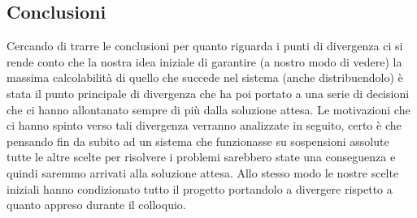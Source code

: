 \subsection{Conclusioni}
Cercando di trarre le conclusioni per quanto riguarda i punti di divergenza ci si rende conto che la nostra idea iniziale di garantire (a nostro modo di vedere) la massima calcolabilità di quello che succede nel sistema (anche distribuendolo) è stata il punto principale di divergenza che ha poi portato a una serie di decisioni che ci hanno allontanato sempre di più dalla soluzione attesa. Le motivazioni che ci hanno spinto verso tali divergenza verranno analizzate in seguito, certo è che pensando fin da subito ad un sistema che funzionasse su sospensioni assolute tutte le altre scelte per risolvere i problemi sarebbero state una conseguenza e quindi saremmo arrivati alla soluzione attesa. Allo stesso modo le nostre scelte iniziali hanno condizionato tutto il progetto portandolo a divergere rispetto a quanto appreso durante il colloquio.